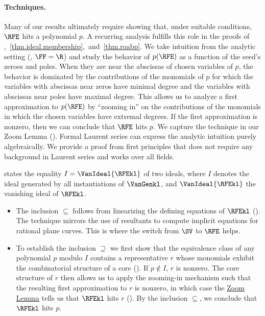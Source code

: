 \documentclass{toc}
\begin{document}
\paragraph{Techniques.}
Many of our results ultimately require showing that,
under suitable conditions,
\(\RFE\) hits a polynomial \(p\).
A recurring analysis fulfills this role in the proofs of
,~\ref{thm.ideal.membership},~and~\ref{thm.roabp}.
We take intuition from the analytic setting (\eg, \(\FF = \R\))
and study the behavior of \(p(\RFE)\) as a function of the seed's zeroes and poles. When they are near the abscissas of chosen variables of
\(p\), the behavior is dominated by the contributions of the monomials of \(p\)
for which
the variables with abscissas near zeros have minimal degree and
the variables with abscissas near poles have maximal degree.
This allows us to analyze a first approximation to \(p(\RFE)\) by ``zooming in'' on
the contributions of the monomials in which the chosen
variables have extremal degrees.
If the first approximation is nonzero,
then we can conclude that \(\RFE\) hits \(p\).
We capture the technique in our Zoom Lemma ().
Formal Laurent series can express the analytic intuition purely algebraically. We provide a proof from first principles that does not require any background in Laurent series and works over all fields.

 states the equality $I = \VanIdeal{\RFEkl}$ of two ideals,
where $I$ denotes the ideal generated by all instantiations of $\VanGenkl$,
and $\VanIdeal{\RFEkl}$ the vanishing ideal of $\RFEkl$.
\begin{itemize}
  \item
    The inclusion $\subseteq$ follows from linearizing the defining equations
    of $\RFEkl$ ().
    The technique mirrors the use of resultants to compute implicit equations
    for rational plane curves.
    This is where the switch from $\SV$ to $\RFE$ helps. 
  \item
    To establish the inclusion $\supseteq$ we first show that the
    equivalence class of any polynomial $p$ modulo $I$
    contains a representative $r$ whose monomials exhibit the combinatorial
    structure of a core (). If $p \not\in I$, $r$ is nonzero.
    The core structure of $r$ then allows us to apply the zooming-in mechanism such that the resulting first approximation to $r$ is nonzero, in which case the \hyperref[lem.multi-zsub-deriv]{Zoom Lemma} tells us that $\RFEkl$ hits $r$ (). By the inclusion $\subseteq$, we conclude that $\RFEkl$ hits $p$.
\end{itemize}
\end{document}
